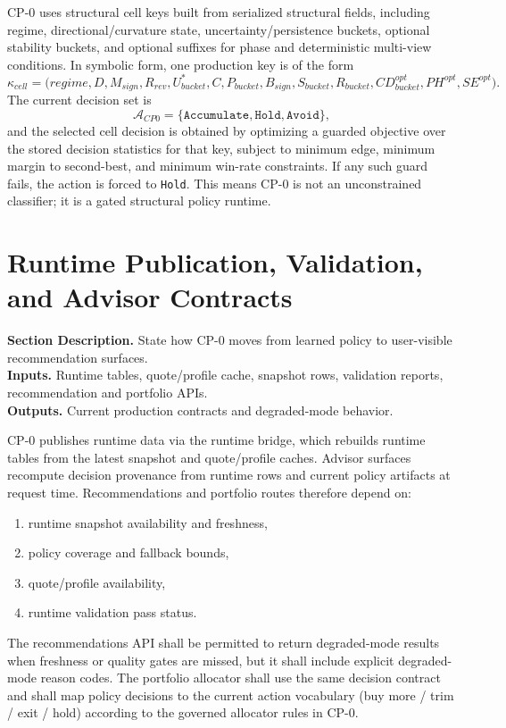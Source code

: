 \documentclass[11pt]{report}
\newcommand{\meta}[3]{\textbf{Section Description.} #1\\
\textbf{Inputs.} #2\\
\textbf{Outputs.} #3\par}
\begin{document}
CP-0 uses structural cell keys built from serialized structural fields, including regime, directional/curvature state, uncertainty/persistence buckets, optional stability buckets, and optional suffixes for phase and deterministic multi-view conditions. In symbolic form, one production key is of the form
\[
\kappa_{cell}=\big(regime, D, M_{sign}, R_{rev}, U^{\ast}_{bucket}, C, P_{bucket}, B_{sign}, S_{bucket}, R_{bucket}, CD_{bucket}^{opt}, PH^{opt}, SE^{opt}\big).
\]
The current decision set is
\[
\mathcal{A}_{CP0}=\{\texttt{Accumulate},\texttt{Hold},\texttt{Avoid}\},
\]
and the selected cell decision is obtained by optimizing a guarded objective over the stored decision statistics for that key, subject to minimum edge, minimum margin to second-best, and minimum win-rate constraints. If any such guard fails, the action is forced to \texttt{Hold}. This means CP-0 is not an unconstrained classifier; it is a gated structural policy runtime.

\section{Runtime Publication, Validation, and Advisor Contracts}
\meta{State how CP-0 moves from learned policy to user-visible recommendation surfaces.}{Runtime tables, quote/profile cache, snapshot rows, validation reports, recommendation and portfolio APIs.}{Current production contracts and degraded-mode behavior.}

CP-0 publishes runtime data via the runtime bridge, which rebuilds runtime tables from the latest snapshot and quote/profile caches. Advisor surfaces recompute decision provenance from runtime rows and current policy artifacts at request time. Recommendations and portfolio routes therefore depend on:
\begin{enumerate}[leftmargin=1.2cm]
    \item runtime snapshot availability and freshness,
    \item policy coverage and fallback bounds,
    \item quote/profile availability,
    \item runtime validation pass status.
\end{enumerate}

The recommendations API shall be permitted to return degraded-mode results when freshness or quality gates are missed, but it shall include explicit degraded-mode reason codes. The portfolio allocator shall use the same decision contract and shall map policy decisions to the current action vocabulary (buy more / trim / exit / hold) according to the governed allocator rules in CP-0.
\end{document}
